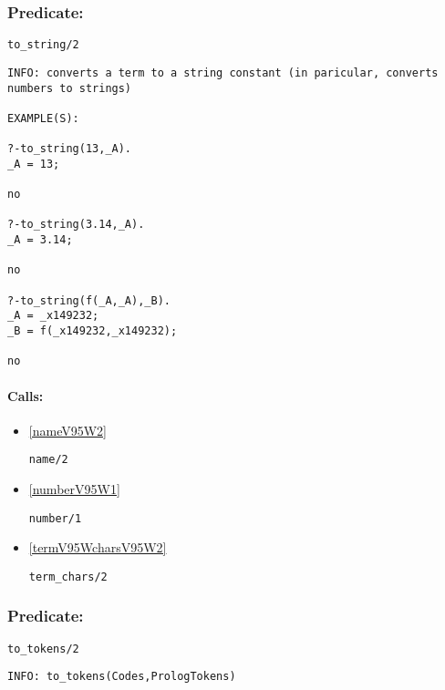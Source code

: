 \subsubsection{Predicate:} \label{toV95WstringV95W2}

\begin{verbatim}
to_string/2
\end{verbatim}

{\small \begin{verbatim}
INFO: converts a term to a string constant (in paricular, converts numbers to strings)

EXAMPLE(S):

?-to_string(13,_A).
_A = 13;

no

?-to_string(3.14,_A).
_A = 3.14;

no

?-to_string(f(_A,_A),_B).
_A = _x149232;
_B = f(_x149232,_x149232);

no

\end{verbatim}}
\paragraph{Calls:} 
\begin{itemize}
\item \ref{nameV95W2} 
\begin{verbatim}
name/2
\end{verbatim}

\item \ref{numberV95W1} 
\begin{verbatim}
number/1
\end{verbatim}

\item \ref{termV95WcharsV95W2} 
\begin{verbatim}
term_chars/2
\end{verbatim}

\end{itemize}

\subsubsection{Predicate:} \label{toV95WtokensV95W2}

\begin{verbatim}
to_tokens/2
\end{verbatim}

{\small \begin{verbatim}
INFO: to_tokens(Codes,PrologTokens)

\end{verbatim}}
